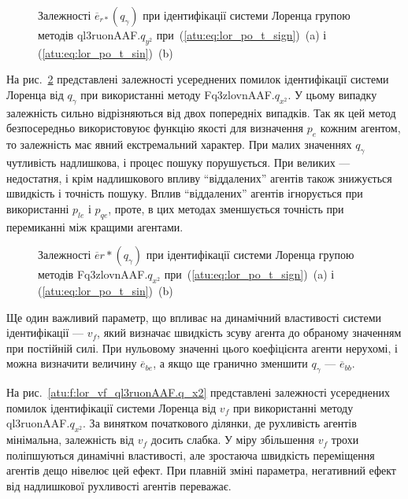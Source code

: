 \begin{figure}[htb!]
  \caption{Залежності $\overline{e}_{r *}(q_\gamma) $ при ідентифікації системи Лоренца групою методів ql3ruonAAF.$q_{y^2} $ при~(\ref{atu:eq:lor_po_t_sign})~(a) і (\ref{atu:eq:lor_po_t_sin})~(b)}
  \label{atu:f:lor_qg_ql3ruonAAF.q_y2}
\end{figure}


На рис.~\ref{atu:f:lor_qg_Fq3zlovnAAF.q_x2} представлені залежності усереднених
помилок ідентифікації системи Лоренца від
$q_\gamma$ при використанні методу
Fq3zlovnAAF.$q_{x^2}$.
У цьому випадку залежність сильно відрізняються від двох
попередніх випадків. Так як цей метод безпосередньо
використовуює функцію якості для визначення
$p_e$ кожним агентом, то залежність має явний екстремальний
характер. При малих значеннях
$q_\gamma$ чутливість надлишкова, і процес пошуку порушується. При
великих --- недостатня, і крім надлишкового впливу ``віддалених''
агентів також знижується швидкість і точність пошуку. Вплив
``віддалених'' агентів ігнорується при використанні
$p_{le}$ і
$p_{qe}$, проте, в цих методах зменшується точність при перемиканні
між кращими агентами.


\begin{figure}[htb!]
  \caption{Залежності $\overline{e}{r *} (q_\gamma)$ при ідентифікації системи Лоренца групою методів Fq3zlovnAAF.$q_{x^2} $ при~(\ref{atu:eq:lor_po_t_sign})~(a) і (\ref{atu:eq:lor_po_t_sin})~(b)}
  \label{atu:f:lor_qg_Fq3zlovnAAF.q_x2}
\end{figure}


Ще один важливий параметр, що впливає на динамічний властивості
системи ідентифікації ---
$v_f $, який визначає швидкість зсуву агента до обраному значенням
при постійній силі. При нульовому значенні цього коефіцієнта
агенти нерухомі, і можна визначити величину
$\overline{e}_{be} $, а якщо ще гранично зменшити
$q_\gamma $ ---
$\overline{e}_{bb} $.



На рис.~\ref{atu:f:lor_vf_ql3ruonAAF.q_x2} представлені залежності усереднених
помилок ідентифікації системи Лоренца від
$v_f $ при використанні методу
ql3ruonAAF.$q_{x^2}$.
За винятком початкового ділянки, де рухливість агентів
мінімальна, залежність від
$v_f $ досить слабка. У міру збільшення
$v_f $ трохи поліпшуються динамічні властивості, але зростаюча
швидкість переміщення агентів дещо нівелює цей ефект. При
плавній зміні параметра, негативний ефект від надлишкової
рухливості агентів переважає.

